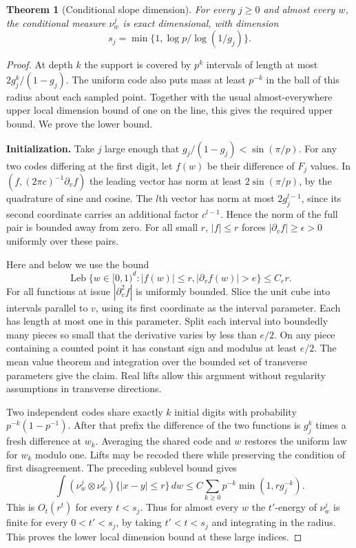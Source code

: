 \documentclass[11pt,a4paper]{article}
\newtheorem{theorem}{Theorem}[section]
\begin{document}
\begin{theorem}[Conditional slope dimension]\label{thm:algebraic-slope-dimension}
For every $j\ge0$ and almost every $w$, the conditional measure
$\nu^j_w$ is exact dimensional, with dimension
\[
                 s_j=\min\{1,\log p/\log(1/g_j)\}.
\]
\end{theorem}
\begin{proof}
At depth $k$ the support is covered by $p^k$ intervals of length at most
$2g_j^k/(1-g_j)$. The uniform code also puts mass at least $p^{-k}$
in the ball of this radius about each sampled point. Together with the
usual almost-everywhere upper local dimension bound of one on the line,
this gives the required upper bound. We prove the lower bound.

\par\smallskip\noindent\textbf{Initialization.}\enspace
Take $j$ large enough that $g_j/(1-g_j)<\sin(\pi/p)$. For any two
codes differing at the first digit, let $f(w)$ be their difference
of $F_j$ values. In $(f,(2\pi c)^{-1}\partial_v f)$ the leading
vector has norm at least $2\sin(\pi/p)$, by the quadrature of sine
and cosine. The $l$th vector has norm at most $2g_j^{l-1}$, since
its second coordinate carries an additional factor $c^{l-1}$.
Hence the norm of the full pair is bounded away from zero. For all
small $r$, $|f|\le r$ forces $|\partial_v f|\ge\epsilon>0$
uniformly over these pairs.

Here and below we use the bound
\[
 \operatorname{Leb}\{w\in[0,1)^d:|f(w)|\le r,
                       |\partial_v f(w)|>e\}\le C_e r .
\]
For all functions at issue $|\partial_v^2 f|$ is uniformly bounded.
Slice the unit cube into intervals parallel to $v$, using its first
coordinate as the interval parameter. Each has length at most one in
this parameter. Split each interval into boundedly many pieces so small
that the derivative varies by less than $e/2$. On any piece containing
a counted point it has constant sign and modulus at least $e/2$.
The mean value theorem and integration over the bounded set of transverse
parameters give the claim. Real lifts allow this argument without
regularity assumptions in transverse directions.

Two independent codes share exactly $k$ initial digits with probability
$p^{-k}(1-p^{-1})$. After that prefix the difference of the two
functions is $g_j^k$ times a fresh difference at $w_k$. Averaging the
shared code and $w$ restores the uniform law for $w_k$ modulo one.
Lifts may be recoded there while preserving the condition of first
disagreement. The preceding sublevel bound gives
\[
   \int (\nu^j_w\otimes\nu^j_w)\{|x-y|\le r\}\,dw
       \le C\sum_{k\ge0}p^{-k}\min(1,r g_j^{-k}).
\]
This is $O_t(r^t)$ for every $t<s_j$. Thus for almost every $w$ the
$t'$-energy of $\nu^j_w$ is finite for every $0<t'<s_j$, by taking
$t'<t<s_j$ and integrating in the radius. This proves the lower
local dimension bound at these large indices.


\end{proof}
\end{document}
